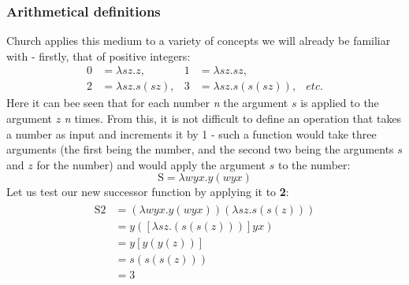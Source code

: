 \documentclass {article}
\begin{document}
\subsubsection{Arithmetical definitions}

Church applies this medium to a variety of concepts we will already be familiar with - firstly, that of positive integers:
\begin{equation*}
\begin{aligned}
\bm{\mathrm{0}} &= \lambda sz.z,
  & %
\bm{\mathrm{1}} &= \lambda sz.sz,
  \\
\bm{\mathrm{2}} &= \lambda sz.s(sz),
  &
\bm{\mathrm{3}} &= \lambda sz.s(s(sz)),
  &
etc.
\end{aligned}
\end{equation*}
Here it can bee seen that for each number \textit{n} the argument $s$  is applied to the argument $z$ \textit{n} times.
From this, it is not difficult to define an operation that takes a number as input and increments it by 1 - such a function would take three arguments (the first being the number, and the second two being the arguments $s$ and $z$ for the number) and would apply the argument $s$ to the number:
\begin{equation*}
\bm{\mathrm{S}} = \lambda wyx.y(wyx)
\end{equation*}
Let us test our new successor function by applying it to \textbf{2}:
\begin{gather*}
\begin{aligned}
\bm{\mathrm{S2}} &= (\lambda wyx.y(wyx)) (\lambda sz.s(s(z)))\\
&= y([\lambda sz.(s(s(z)))]yx)\\
&=y[y(y(z))]\\
&=s(s(s(z)))\\
&=\bm{\mathrm{3}}
\end{aligned}
\end{gather*}
\end{document}
